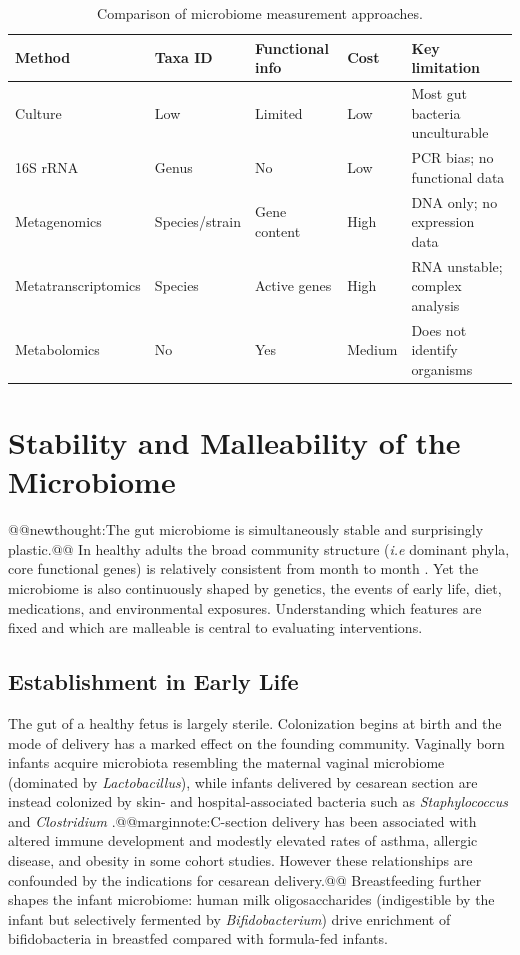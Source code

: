 \documentclass{tufte-handout}
\makeatletter
\def\newthought#1{@@newthought:#1@@}
\def\marginnote#1{@@marginnote:#1@@}
\makeatother
\begin{document}
\begin{table}[ht]
\caption{Comparison of microbiome measurement approaches.}\label{tab:methods}
\begin{tabular}{lllll}
\toprule
\textbf{Method} & \textbf{Taxa ID} & \textbf{Functional info} & \textbf{Cost} & \textbf{Key limitation} \\ \midrule
Culture & Low & Limited & Low & Most gut bacteria unculturable \\
16S rRNA & Genus & No & Low & PCR bias; no functional data \\
Metagenomics & Species/strain & Gene content & High & DNA only; no expression data \\
Metatranscriptomics & Species & Active genes & High & RNA unstable; complex analysis \\
Metabolomics & No & Yes & Medium & Does not identify organisms \\ \bottomrule
\end{tabular}
\end{table}

\section{Stability and Malleability of the Microbiome}

\newthought{The gut microbiome is simultaneously stable and surprisingly plastic.} In healthy adults the broad community structure (\textit{i.e} dominant phyla, core functional genes) is relatively consistent from month to month \citep{costelloHumanlyDefinedMicrobial2009}. Yet the microbiome is also continuously shaped by genetics, the events of early life, diet, medications, and environmental exposures. Understanding which features are fixed and which are malleable is central to evaluating interventions.

\subsection{Establishment in Early Life}

The gut of a healthy fetus is largely sterile. Colonization begins at birth and the mode of delivery has a marked effect on the founding community. Vaginally born infants acquire microbiota resembling the maternal vaginal microbiome (dominated by \textit{Lactobacillus}), while infants delivered by cesarean section are instead colonized by skin- and hospital-associated bacteria such as \textit{Staphylococcus} and \textit{Clostridium} \citep{dominguezBelloDeliveryModeShapes2010}.\marginnote{C-section delivery has been associated with altered immune development and modestly elevated rates of asthma, allergic disease, and obesity in some cohort studies.  However these relationships are confounded by the indications for cesarean delivery.} Breastfeeding further shapes the infant microbiome: human milk oligosaccharides (indigestible by the infant but selectively fermented by \textit{Bifidobacterium}) drive enrichment of bifidobacteria in breastfed compared with formula-fed infants.
\end{document}
